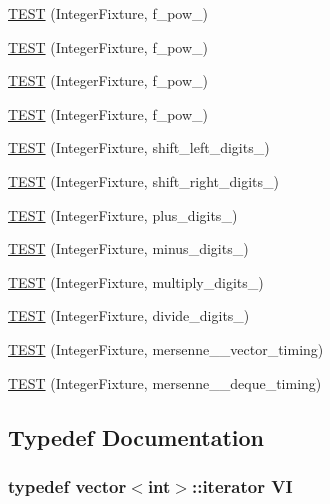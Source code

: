 \begin{DoxyCompactItemize}
\item 
\hyperlink{TestInteger_8c_09_09_a7781293effc559ae75c90b531c18838d}{T\-E\-S\-T} (Integer\-Fixture, f\-\_\-pow\-\_)
\item 
\hyperlink{TestInteger_8c_09_09_a96f53268237ae6caecf82dee008ba62c}{T\-E\-S\-T} (Integer\-Fixture, f\-\_\-pow\-\_)
\item 
\hyperlink{TestInteger_8c_09_09_a3e329bc3fd8a6f86438a23ad2d4c092a}{T\-E\-S\-T} (Integer\-Fixture, f\-\_\-pow\-\_)
\item 
\hyperlink{TestInteger_8c_09_09_acf8b60c2332ff6dd73673c354a5abab5}{T\-E\-S\-T} (Integer\-Fixture, f\-\_\-pow\-\_)
\item 
\hyperlink{TestInteger_8c_09_09_a013a297a1b08b30e0dcb746952764a2a}{T\-E\-S\-T} (Integer\-Fixture, shift\-\_\-left\-\_\-digits\-\_)
\item 
\hyperlink{TestInteger_8c_09_09_a95b8f68e2988a37232494c60c0e8ca15}{T\-E\-S\-T} (Integer\-Fixture, shift\-\_\-right\-\_\-digits\-\_)
\item 
\hyperlink{TestInteger_8c_09_09_ac1865dc8ee59efbe927076dfb952b572}{T\-E\-S\-T} (Integer\-Fixture, plus\-\_\-digits\-\_)
\item 
\hyperlink{TestInteger_8c_09_09_a7882d37506c29f367c57c480f6d32321}{T\-E\-S\-T} (Integer\-Fixture, minus\-\_\-digits\-\_)
\item 
\hyperlink{TestInteger_8c_09_09_aaa1c0cd66ee99d32993014c9156a7dab}{T\-E\-S\-T} (Integer\-Fixture, multiply\-\_\-digits\-\_)
\item 
\hyperlink{TestInteger_8c_09_09_afd58fc7cb24809a388b3af1b70eb9f94}{T\-E\-S\-T} (Integer\-Fixture, divide\-\_\-digits\-\_)
\item 
\hyperlink{TestInteger_8c_09_09_a15a34a8ba62851147163edcf3922f3e6}{T\-E\-S\-T} (Integer\-Fixture, mersenne\-\_\-\_\-vector\-\_\-timing)
\item 
\hyperlink{TestInteger_8c_09_09_a943732aad5273df87a4822f32c9b9471}{T\-E\-S\-T} (Integer\-Fixture, mersenne\-\_\-\_\-deque\-\_\-timing)
\end{DoxyCompactItemize}


\subsection{Typedef Documentation}
\hypertarget{TestInteger_8c_09_09_a7f7776c3795227593917f3caa8489aba}{
\subsubsection[{V\-I}]{\setlength{\rightskip}{0pt plus 5cm}typedef vector$<$int$>$\-::iterator {\bf V\-I}}}\label{TestInteger_8c_09_09_a7f7776c3795227593917f3caa8489aba}


